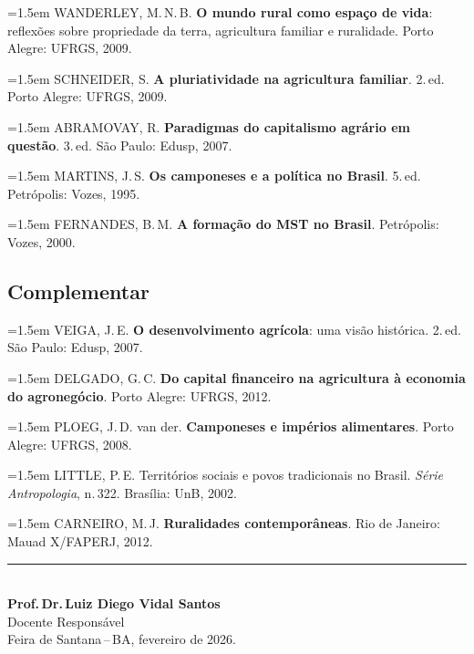 \documentclass[11pt,a4paper]{article}
\begin{document}
\begin{small}
\hangindent=1.5em
WANDERLEY, M.\,N.\,B. \textbf{O mundo rural como espaço de vida}: reflexões sobre propriedade da terra, agricultura familiar e ruralidade. Porto Alegre: UFRGS, 2009.\par\medskip

\hangindent=1.5em
SCHNEIDER, S. \textbf{A pluriatividade na agricultura familiar}. 2.\,ed. Porto Alegre: UFRGS, 2009.\par\medskip

\hangindent=1.5em
ABRAMOVAY, R. \textbf{Paradigmas do capitalismo agrário em questão}. 3.\,ed. São Paulo: Edusp, 2007.\par\medskip

\hangindent=1.5em
MARTINS, J.\,S. \textbf{Os camponeses e a política no Brasil}. 5.\,ed. Petrópolis: Vozes, 1995.\par\medskip

\hangindent=1.5em
FERNANDES, B.\,M. \textbf{A formação do MST no Brasil}. Petrópolis: Vozes, 2000.\par\medskip
\end{small}

\subsection*{Complementar}

\begin{small}
\hangindent=1.5em
VEIGA, J.\,E. \textbf{O desenvolvimento agrícola}: uma visão histórica. 2.\,ed. São Paulo: Edusp, 2007.\par\medskip

\hangindent=1.5em
DELGADO, G.\,C. \textbf{Do capital financeiro na agricultura à economia do agronegócio}. Porto Alegre: UFRGS, 2012.\par\medskip

\hangindent=1.5em
PLOEG, J.\,D. van der. \textbf{Camponeses e impérios alimentares}. Porto Alegre: UFRGS, 2008.\par\medskip

\hangindent=1.5em
LITTLE, P.\,E. Territórios sociais e povos tradicionais no Brasil. \textit{Série Antropologia}, n.\,322. Brasília: UnB, 2002.\par\medskip

\hangindent=1.5em
CARNEIRO, M.\,J. \textbf{Ruralidades contemporâneas}. Rio de Janeiro: Mauad X/FAPERJ, 2012.\par\medskip
\end{small}



\vfill

\begin{center}
\noindent\rule{6cm}{0.4pt}\\[6pt]
\textbf{Prof.\,Dr.\,Luiz Diego Vidal Santos}\\
Docente Responsável\\[4pt]
{\small Feira de Santana\,--\,BA, fevereiro de 2026.}
\end{center}
\end{document}
